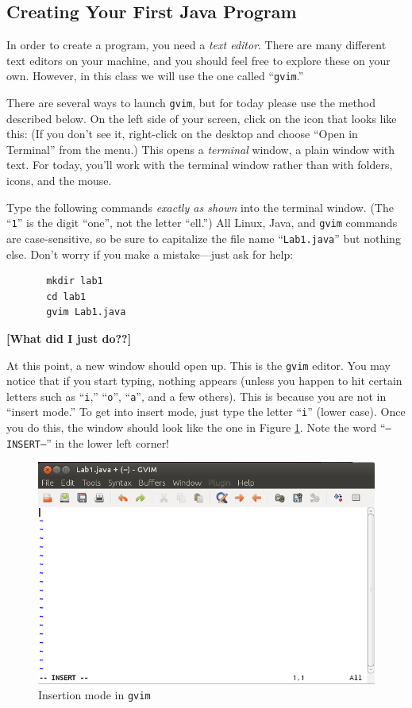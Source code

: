 \subsection*{Creating Your First Java Program}
In order to create a program, you need a {\em text editor}. There are
many different text editors on your machine, and  you should feel free
to explore these on your own. However, in this class we will use the one  called ``{\tt gvim}.''

There are several ways to launch {\tt gvim}, but for today please use the
method described below.
On the left side of your screen, click on the icon that looks like this:
(If you don't see it, right-click on the desktop and choose ``Open in
  Terminal'' from the menu.)  This opens a
{\em terminal} window, a plain window with text. For today, you'll work
with the terminal window rather than with folders, icons, and the mouse.

Type the following commands {\em exactly as shown} into the terminal window. 
(The ``{\tt 1}'' is the digit ``one'', not the letter ``ell.'') All Linux, Java, 
and {\tt gvim}
commands are case-sensitive, so be sure to capitalize the file name 
``{\tt Lab1.java}'' but nothing else.
Don't worry if you make a mistake---just ask for help:
\begin{verbatim}
       mkdir lab1
       cd lab1
       gvim Lab1.java
       \end{verbatim}
       {\color{red}\bf [What did I just do??]}

       At this point, a new window should open up. This is the {\tt gvim} editor.
       You may notice that if you start typing, nothing appears (unless you happen to
         hit certain letters such as ``{\tt i},'' ``{\tt o}'', ``{\tt a}'', and a few
         others). This is because you are not in ``insert mode.'' To get into insert mode,
       just type the letter ``{\tt i}'' (lower case). Once you do this, the window should 
       look like the one in Figure \ref{gvim-insert}. Note the word ``{\tt --INSERT--}''
       in the lower left corner!

       \begin{figure}[htbp]
         \centering
         \includegraphics[width=4.5in]{images/gvim-insert}
         \caption{Insertion mode in {\tt gvim}}
         \label{gvim-insert}
       \end{figure}

